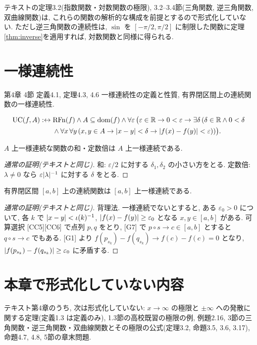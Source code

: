 テキストの定理3.2(指数関数・対数関数の極限), 3.2--3.4節(三角関数, 逆三角関数, 双曲線関数)は, これらの関数の解析的な構成を前提とするので形式化していない. ただし逆三角関数の連続性は, $\sin$ を $[-\pi/2, \pi/2]$ に制限した関数に定理\ref{thm:inverse}を適用すれば, 対数関数と同様に得られる.

\section{一様連続性}

\begin{textref}{第4章 4節 定義4.1, 定理4.3, 4.6}
  一様連続性の定義と性質, 有界閉区間上の連続関数の一様連続性.
\end{textref}

\begin{dfn}[テキスト定義4.1]
  \begin{align*}
    \mathrm{UC}(f, A) :\leftrightarrow{}& \mathrm{RFn}(f) \land A \subseteq \mathrm{dom}(f) \land \forall\varepsilon\,\bigl(\varepsilon \in \mathbb{R} \to 0 < \varepsilon \to \exists\delta\,(\delta \in \mathbb{R} \land 0 < \delta \\
    & \land \forall x\,\forall y\,(x, y \in A \to \lvert x - y\rvert < \delta \to \lvert f(x) - f(y)\rvert < \varepsilon))\bigr).
  \end{align*}
\end{dfn}

\begin{thm}[テキスト定理4.3]
  $A$ 上一様連続な関数の和・定数倍は $A$ 上一様連続である.
\end{thm}
\begin{proof}[通常の証明(テキストと同じ)]
  和: $\varepsilon/2$ に対する $\delta_1, \delta_2$ の小さい方をとる. 定数倍: $\lambda \neq 0$ なら $\varepsilon\lvert \lambda\rvert^{-1}$ に対する $\delta$ をとる.
\end{proof}

\begin{thm}
  有界閉区間 $[a, b]$ 上の連続関数は $[a, b]$ 上一様連続である.
\end{thm}
\begin{proof}[通常の証明(テキストと同じ)]
  背理法. 一様連続でないとすると, ある $\varepsilon_0 > 0$ について, 各 $k$ で $\lvert x - y\rvert < \iota(k)^{-1}$, $\lvert f(x) - f(y)\rvert \geq \varepsilon_0$ となる $x, y \in [a, b]$ がある. 可算選択 [CC5][CC6] で点列 $p, q$ をとり, [G7] で $p \circ s \to c \in [a, b]$ とすると $q \circ s \to c$ でもある. [G1] より $f(p_{s_k}) - f(q_{s_k}) \to f(c) - f(c) = 0$ となり, $\lvert f(p_{s_k}) - f(q_{s_k})\rvert \geq \varepsilon_0$ に矛盾する.
\end{proof}

\section{本章で形式化していない内容}

テキスト第4章のうち, 次は形式化していない: $x \to \infty$ の極限と $\pm\infty$ への発散に関する定理(定義1.3 は定義のみ), 1.3節の高校既習の極限の例, 例題2.16, 3節の三角関数・逆三角関数・双曲線関数とその極限の公式(定理3.2, 命題3.5, 3.6, 3.17), 命題4.7, 4.8, 5節の章末問題.
